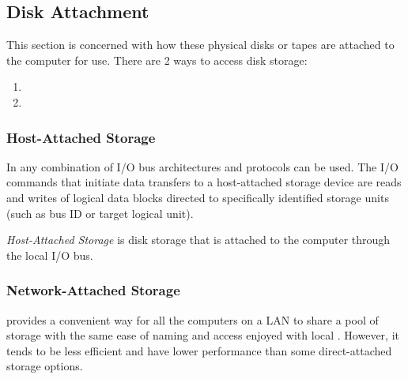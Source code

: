 \subsection{Disk Attachment}\label{subsec:Disk_Attachment}
This section is concerned with how these physical disks or tapes are attached to the computer for use.
There are 2 ways to access disk storage:
\begin{enumerate}[noitemsep]
\item {}
\item {}
\end{enumerate}

\subsubsection{Host-Attached Storage}\label{subsubsec:Host_Attached_Storage}
In  any combination of I/O bus architectures and protocols can be used.
The I/O commands that initiate data transfers to a host-attached storage device are reads and writes of logical data blocks directed to specifically identified storage units (such as bus ID or target logical unit).

\begin{definition}\label{def:Host_Attached_Storage}
  \emph{Host-Attached Storage} is disk storage that is attached to the computer through the local I/O bus.
\end{definition}

\subsubsection{Network-Attached Storage}\label{subsubsec:Network_Attached_Storage}
 provides a convenient way for all the computers on a LAN to share a pool of storage with the same ease of naming and access enjoyed with local .
However, it tends to be less efficient and have lower performance than some direct-attached storage options.



